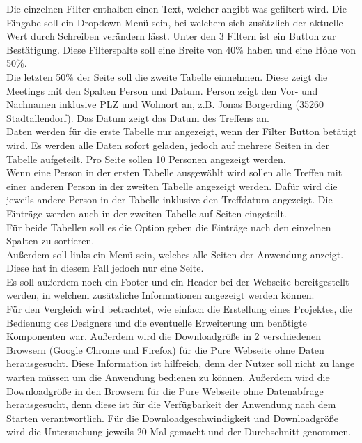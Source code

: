 \documentclass[ngerman]{article}
\begin{document}
    Die einzelnen Filter enthalten einen Text, welcher angibt was gefiltert wird. Die Eingabe soll ein Dropdown Menü sein, bei welchem sich zusätzlich der aktuelle Wert durch Schreiben verändern lässt. Unter den 3 Filtern ist ein Button zur Bestätigung. Diese Filterspalte soll eine Breite von 40\% haben und eine Höhe von 50\%.\\
    Die letzten 50\% der Seite soll die zweite Tabelle einnehmen. Diese zeigt die Meetings mit den Spalten Person und Datum. Person zeigt den Vor- und Nachnamen inklusive PLZ und Wohnort an, z.B. Jonas Borgerding (35260 Stadtallendorf). Das Datum zeigt das Datum des Treffens an.\\
    Daten werden für die erste Tabelle nur angezeigt, wenn der Filter Button betätigt wird. Es werden alle Daten sofort geladen, jedoch auf mehrere Seiten in der Tabelle aufgeteilt. Pro Seite sollen 10 Personen angezeigt werden.\\
    Wenn eine Person in der ersten Tabelle ausgewählt wird sollen alle Treffen mit einer anderen Person in der zweiten Tabelle angezeigt werden. Dafür wird die jeweils andere Person in der Tabelle inklusive den Treffdatum angezeigt. Die Einträge werden auch in der zweiten Tabelle auf Seiten eingeteilt.\\
    Für beide Tabellen soll es die Option geben die Einträge nach den einzelnen Spalten zu sortieren.\\
    Außerdem soll links ein Menü sein, welches alle Seiten der Anwendung anzeigt. Diese hat in diesem Fall jedoch nur eine Seite.\\
    Es soll außerdem noch ein Footer und ein Header bei der Webseite bereitgestellt werden, in welchem zusätzliche Informationen angezeigt werden können.\\
    Für den Vergleich wird betrachtet, wie einfach die Erstellung eines Projektes, die Bedienung des Designers und die eventuelle Erweiterung um benötigte Komponenten war. Außerdem wird die Downloadgröße in 2 verschiedenen Browsern (Google Chrome und Firefox) für die Pure Webseite ohne Daten herausgesucht. Diese Information ist hilfreich, denn der Nutzer soll nicht zu lange warten müssen um die Anwendung bedienen zu können. Außerdem wird die Downloadgröße in den Browsern für die Pure Webseite ohne Datenabfrage herausgesucht, denn diese ist für die Verfügbarkeit der Anwendung nach dem Starten verantwortlich. Für die Downloadgeschwindigkeit und Downloadgröße wird die Untersuchung jeweils 20 Mal gemacht und der Durchschnitt genommen.\\
\end{document}
